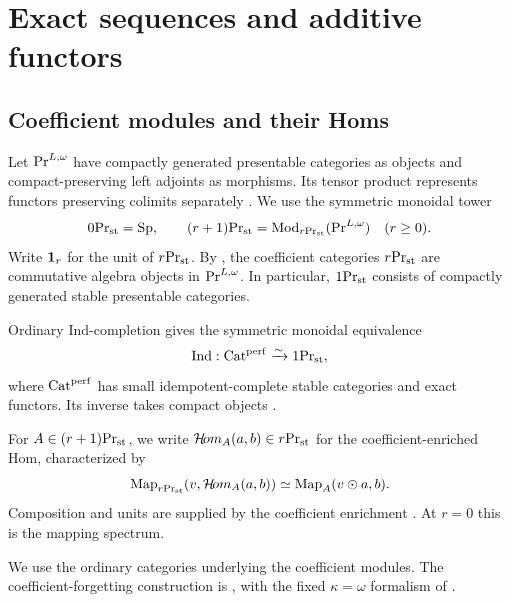 \section{Exact sequences and additive functors}
\label{sec:conventions}

\subsection{Coefficient modules and their Homs}

\begin{definition}\label{def:presentable-coefficients}
Let $\mathrm{Pr}^{L,\omega}$ have compactly generated presentable categories as objects
and compact-preserving left adjoints as morphisms. Its tensor product
represents functors preserving colimits separately
\citep[Section~4.8.1]{LurieHA}. We use the symmetric monoidal tower
\begin{equation}\label{eq:coefficient-tower}
 {0}\mathrm{Pr}_{\mathrm{st}}=\mathrm{Sp},\qquad
 {(r+1)}\mathrm{Pr}_{\mathrm{st}}=\operatorname{Mod}_{{r}\mathrm{Pr}_{\mathrm{st}}}(\mathrm{Pr}^{L,\omega})\quad(r\geq0).
\end{equation}
Write $\mathbf 1_r$ for the unit of ${r}\mathrm{Pr}_{\mathrm{st}}$.
By \citep[Section~2.1]{Aoki}, the coefficient categories
${r}\mathrm{Pr}_{\mathrm{st}}$ are commutative algebra objects in $\mathrm{Pr}^{L,\omega}$.
In particular, ${1}\mathrm{Pr}_{\mathrm{st}}$ consists of compactly generated
stable presentable categories.
\end{definition}

Ordinary Ind-completion gives the symmetric monoidal equivalence
\begin{equation}\label{eq:stable-ind-equivalence}
 \operatorname{Ind}:\operatorname{Cat}^{\mathrm{perf}}\xrightarrow{\sim}{1}\mathrm{Pr}_{\mathrm{st}},
\end{equation}
where $\operatorname{Cat}^{\mathrm{perf}}$ has small idempotent-complete stable
categories and exact functors. Its inverse takes compact objects
\citep{BGT,LurieHA}.

For $A\in{(r+1)}\mathrm{Pr}_{\mathrm{st}}$, we write
$\mathcal{H}\!om_A(a,b)\in{r}\mathrm{Pr}_{\mathrm{st}}$ for the
coefficient-enriched Hom, characterized by
\begin{equation}\label{eq:tensor-hom}
 \operatorname{Map}_{{r}\mathrm{Pr}_{\mathrm{st}}}(v,\mathcal{H}\!om_A(a,b))
 \simeq\operatorname{Map}_A(v\odot a,b).
\end{equation}
Composition and units are supplied by the
coefficient enrichment \citep{GH,Heine}.
At $r=0$ this is the mapping spectrum.

We use the ordinary categories underlying the coefficient modules.
The coefficient-forgetting construction is
\cite[Remark~4.3]{ScholzeGeometry}, with the fixed
$\kappa=\omega$ formalism of
\cite[Definition~1.2 and Section~2.1]{Aoki}.

